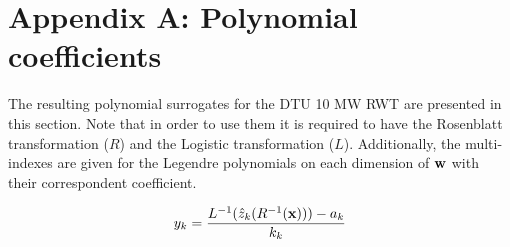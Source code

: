 \documentclass[preprint,12pt]{elsarticle}
\begin{document}

\begin{thebibliography}{00}


\end{thebibliography}

\section*{Appendix A: Polynomial coefficients}
\small
The resulting polynomial surrogates for the DTU 10 MW RWT are presented in this section. Note that in order to use them it is required to have the Rosenblatt transformation ($R$) and the Logistic transformation ($L$). Additionally, the multi-indexes are given for the Legendre polynomials on each dimension of $\mathbf{w}$ with their correspondent coefficient.

$$y_k = \frac{L^{-1}(\hat{z}_k(R^{-1}(\mathbf{x}))) - a_k}{k_k}$$

\tiny
\end{document}
